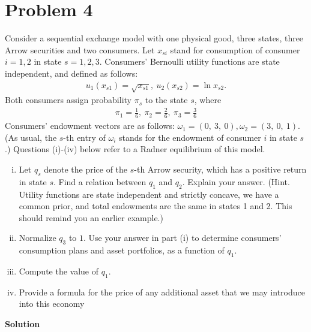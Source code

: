 \documentclass[a4paper]{article}
\begin{document}
\section*{Problem 4}
Consider a sequential exchange model with one physical good, three states, three Arrow
securities and two consumers. Let $x_{si}$ stand for consumption of consumer $i = 1, 2$ in state
$s = 1, 2, 3$. Consumers’ Bernoulli utility functions are state independent, and defined as
follows:
\begin{align*}
u_1(x_{s1}) = \sqrt{x_{s1}},\  u_2(x_{s2}) = \ln x_{s2}.
\end{align*}
Both consumers assign probability $\pi_s$ to the state $s$, where 
\begin{align*}
\pi_1 =\frac{1}{6},\ \pi_2 =\frac{2}{6},\ \pi_3 =\frac{3}{6}
\end{align*}
Consumers’ endowment vectors are as follows:
$\omega_1 = (0,\ 3,\ 0), \omega_2 = (3,\ 0,\ 1)$.
(As usual, the $s$-th entry of $\omega_i$ stands for the endowment of consumer $i$ in state $s$.) Questions
(i)-(iv) below refer to a Radner equilibrium of this model.
\begin{enumerate}[(i)]
\item Let $q_s$ denote the price of the $s$-th Arrow security, which has a positive return in state $s$.
Find a relation between $q_1$ and $q_2$. Explain your answer. (Hint. Utility functions are state
independent and strictly concave, we have a common prior, and total endowments are the
same in states 1 and 2. This should remind you an earlier example.)
\item Normalize $q_3$ to $1$. Use your answer in part (i) to determine consumers’ consumption
plans and asset portfolios, as a function of $q_1$.
\item Compute the value of $q_1$.
\item Provide a formula for the price of any additional asset that we may introduce into this
economy
\end{enumerate}


\textbf{Solution}
\end{document}
